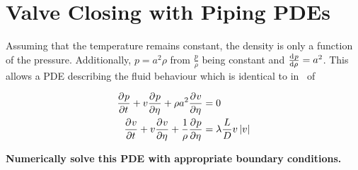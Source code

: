\section{Valve Closing with Piping PDEs}

Assuming that the temperature remains constant, the density is only a function of the pressure. Additionally, $p = a^2 \rho$ from $\frac{p}{\rho}$ being constant and $\diff{p}{\rho} = a^2$. This allows a PDE describing the fluid behaviour which is identical to in~\cite{Hos2015ModelPipe} of

\begin{equation} \label{eq: FluidPDE}
\begin{split}
    \pdiff{p}{t} + v \pdiff{p}{\eta} + \rho a^2 \pdiff{v}{\eta} &= 0 \\
    \pdiff{v}{t} + v \pdiff{v}{\eta} + \frac{1}{\rho} \pdiff{p}{\eta} &= \lambda \frac{L}{D} v \left| v \right|
\end{split}
\end{equation}

\textbf{Numerically solve this PDE with appropriate boundary conditions.}